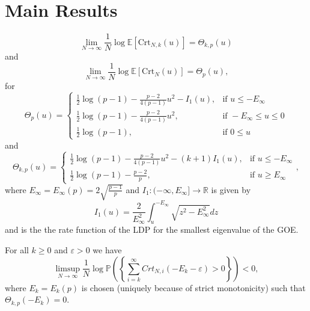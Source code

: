 \section{Main Results}
\begin{theorem}
	\begin{equation}\label{thm:2.5}
		\lim_{N\rightarrow\infty}\frac{1}{N}\log\mathbb E[\text{Crt}_{N,k}(u)] = \Theta_{k,p}(u)
	\end{equation}
	and
	\begin{equation}\label{thm:2.8}
		\lim_{N\rightarrow\infty}\frac{1}{N}\log\mathbb E[\text{Crt}_N(u)] = \Theta_p(u),
	\end{equation}
	for $$\Theta_p(u)=\begin{cases}
						\frac{1}{2}\log(p-1)-\frac{p-2}{4(p-1)}u^2-I_1(u), &\mbox{if } u\leq-E_\infty \\
						\frac{1}{2}\log(p-1)-\frac{p-2}{4(p-1)}u^2, &\mbox{if } -E_\infty\leq u\leq 0\\ 
						\frac{1}{2}\log(p-1), &\mbox{if } 0\leq u
					  \end{cases}$$
	and
	$$\Theta_{k,p}(u)=\begin{cases}
						\frac{1}{2}\log(p-1)-\frac{p-2}{4(p-1)}u^2-(k+1)I_1(u), &\mbox{if } u\leq-E_\infty \\
						\frac{1}{2}\log(p-1)-\frac{p-2}{p}, &\mbox{if } u \geq E_\infty
					  \end{cases},$$
	where $E_\infty=E_\infty(p)=2\sqrt{\frac{p-1}{p}}$ and $I_1:(-\infty,E_\infty]\rightarrow\mathbb R$ is given by $$I_1(u)=\frac{2}{E_\infty^2}\int_u^{-E_\infty}\sqrt{z^2-E_\infty^2}dz$$ and is the the rate function of the LDP for the smallest eigenvalue of the GOE.
\end{theorem}

\begin{theorem}
	For all $k\geq 0$ and $\varepsilon>0$ we have
	\begin{equation}\label{thm:2.15}
		\limsup_{N\rightarrow\infty}\frac{1}{N}\log\mathbb P\left(\left\{\sum_{i=k}^\infty Crt_{N,i}(-E_k-\varepsilon)>0\right\}\right)<0,
	\end{equation}
	where $E_k=E_k(p)$ is chosen (uniquely because of strict monotonicity) such that $\Theta_{k,p}(-E_k)=0$.
\end{theorem}














